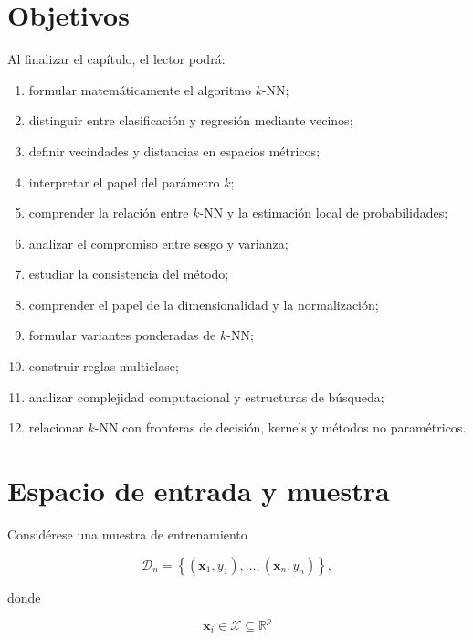 \documentclass[
  spanish,
  10.5pt,
  letterpaper,
  DIV=11,
  numbers=noendperiod,
  oneside,
  open=any]{scrreprt}
\providecommand{\tightlist}{%
  \setlength{\itemsep}{0pt}\setlength{\parskip}{0pt}}
\theoremstyle{definition}
\theoremstyle{definition}
\theoremstyle{plain}
\theoremstyle{remark}
\begin{document}
\section*{Objetivos}\label{objetivos-11}


Al finalizar el capítulo, el lector podrá:

\begin{enumerate}
\def\labelenumi{\arabic{enumi}.}
\tightlist
\item
  formular matemáticamente el algoritmo \(k\)-NN;
\item
  distinguir entre clasificación y regresión mediante vecinos;
\item
  definir vecindades y distancias en espacios métricos;
\item
  interpretar el papel del parámetro \(k\);
\item
  comprender la relación entre \(k\)-NN y la estimación local de
  probabilidades;
\item
  analizar el compromiso entre sesgo y varianza;
\item
  estudiar la consistencia del método;
\item
  comprender el papel de la dimensionalidad y la normalización;
\item
  formular variantes ponderadas de \(k\)-NN;
\item
  construir reglas multiclase;
\item
  analizar complejidad computacional y estructuras de búsqueda;
\item
  relacionar \(k\)-NN con fronteras de decisión, kernels y métodos no
  paramétricos.
\end{enumerate}

\section*{Espacio de entrada y
muestra}\label{espacio-de-entrada-y-muestra}


Considérese una muestra de entrenamiento

\[
\mathcal{D}_n
=
\left\{
(\mathbf{x}_1,y_1),
\ldots,
(\mathbf{x}_n,y_n)
\right\},
\]

donde

\[
\mathbf{x}_i\in\mathcal{X}\subseteq\mathbb{R}^p
\]
\end{document}

